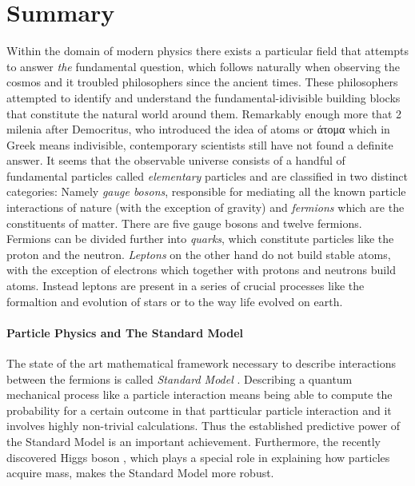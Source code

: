 \chapter*{Summary}
\chaptermark{}
%

Within the domain of modern physics there exists a particular field
that attempts to answer {\it the} fundamental question, which follows
naturally when observing the cosmos and it troubled
philosophers since the ancient times. These philosophers attempted to
identify and understand the fundamental-idivisible building blocks that constitute the natural world
around them. Remarkably enough more that 2 milenia after Democritus, who introduced
the idea of atoms or \textgreek{άτομα} which in Greek means indivisible,
contemporary scientists still have not found a definite answer.
It seems that the observable universe consists of a handful of fundamental particles
called {\it elementary} particles and are classified in two distinct categories:
Namely {\it gauge bosons}, responsible for mediating all the known particle interactions of
nature (with the exception of gravity) and {\it fermions} which are the constituents of
matter. There are five gauge bosons and twelve fermions. Fermions can be divided further
into {\it quarks}, which constitute particles like the proton and the neutron. {\it Leptons}
on the other hand do not build stable atoms, with the exception of electrons which together with
protons and neutrons build atoms. Instead leptons are present in a series of crucial processes
like the formaltion and evolution of stars or to the way life evolved on earth.


\subsubsection{Particle Physics and The Standard Model}
The state of the art mathematical framework necessary to describe interactions between the
fermions is called \textit{Standard Model} \cite{sm-glashow,sm-weinberg,sm-salam}.
Describing a quantum mechanical process like a particle interaction means being able
to compute the probability for a certain outcome in that partticular particle interaction
and it involves highly non-trivial calculations. Thus the established predictive power of
the Standard Model is an important achievement. Furthermore, the recently
discovered Higgs boson \cite{higgs-cms,higgs-atlas}, which plays a special role in
explaining how particles acquire mass, makes the Standard Model more robust.

